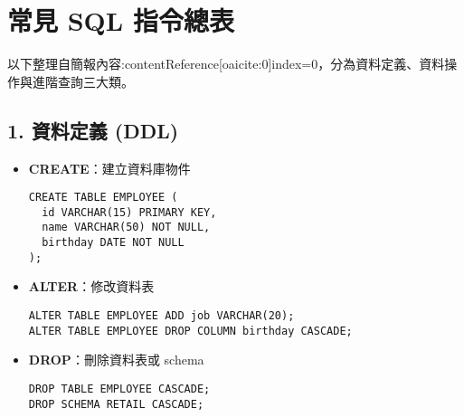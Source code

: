 \documentclass[12pt,a4paper]{article}
\begin{document}
\section*{常見 SQL 指令總表}

以下整理自簡報內容:contentReference[oaicite:0]{index=0}，分為資料定義、資料操作與進階查詢三大類。

\subsection*{1. 資料定義 (DDL)}
\begin{itemize}
  \item \textbf{CREATE}：建立資料庫物件
  \begin{verbatim}
CREATE TABLE EMPLOYEE (
  id VARCHAR(15) PRIMARY KEY,
  name VARCHAR(50) NOT NULL,
  birthday DATE NOT NULL
);
  \end{verbatim}

  \item \textbf{ALTER}：修改資料表
  \begin{verbatim}
ALTER TABLE EMPLOYEE ADD job VARCHAR(20);
ALTER TABLE EMPLOYEE DROP COLUMN birthday CASCADE;
  \end{verbatim}

  \item \textbf{DROP}：刪除資料表或 schema
  \begin{verbatim}
DROP TABLE EMPLOYEE CASCADE;
DROP SCHEMA RETAIL CASCADE;
  \end{verbatim}
\end{itemize}
\end{document}
